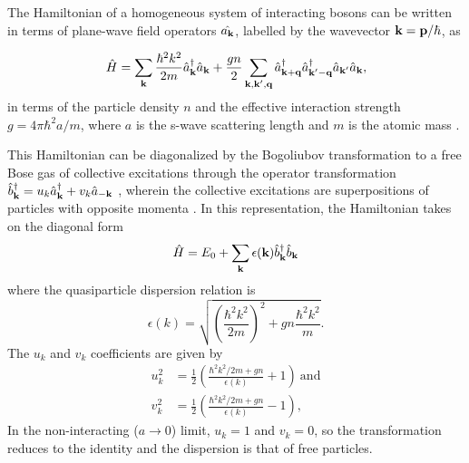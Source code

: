 	The Hamiltonian of a homogeneous system of interacting bosons can be written in terms of plane-wave field operators $\hat{a_{\textbf{k}}}$, labelled by the wavevector $\textbf{k}=\textbf{p}/\hbar$, as

	\begin{equation}
		\hat{H} = \sum_{\textbf{k}} \frac{\hbar^2k^2}{2m}\hat{a}_{\textbf{k}}^\dagger \hat{a}_{\textbf{k}} + \frac{g n}{2}\sum_{\textbf{k},\textbf{k}',{\bf q}}\hat{a}_{\textbf{k}+{\bf q}}^\dagger\hat{a}_{\textbf{k}'-{\bf q}}^\dagger \hat{a}_{\textbf{k}'}\hat{a}_{\textbf{k}},
	\end{equation}
	in terms of the particle density $n$ and the effective interaction strength $g=4\pi\hbar^2a/m$, where $a$ is the s-wave scattering length and $m$ is the atomic mass \cite{PitaevskiiStringari,PethickSmith}.
   
    This Hamiltonian can be diagonalized by the Bogoliubov transformation to a free Bose gas of collective excitations through the operator transformation $\hat{b}_{\textbf{k}}^\dagger = u_k \hat{a}_{\textbf{k}}^\dagger + v_k \hat{a}_{-\textbf{k}}$ \cite{Bogoliubov47,PethickSmith}, wherein the collective excitations are superpositions of particles with opposite momenta \cite{Vogels02}. 
    In this representation, the Hamiltonian takes on the diagonal form 
    \begin{equation}
    	\hat{H} = E_0 + \sum_{\textbf{k}} \epsilon(\textbf{k}) \hat{b}^{\dagger}_{\textbf{k}} \hat{b}_{\textbf{k}}
    \end{equation}
	where the quasiparticle dispersion relation is
	\begin{equation}
		\epsilon(k) = \sqrt{\left(\frac{\hbar^2k^2}{2m}\right)^2 + gn\frac{ \hbar^2k^2}{m}}.
	\end{equation}
    The $u_k$ and $v_k$ coefficients are given by
	\begin{align}
		u_{k}^2 &= \frac{1}{2}\left(\frac{\hbar^2k^2/2m + gn}{\epsilon(k)} + 1\right)~\textrm{and}\\
		v_{k}^2 &= \frac{1}{2}\left(\frac{\hbar^2k^2/2m + gn}{\epsilon(k)} - 1\right),
	\end{align}
	In the non-interacting ($a\rightarrow0$) limit, $u_k=1$ and $v_k=0$, so the transformation reduces to the identity and the dispersion is that of free particles. 

